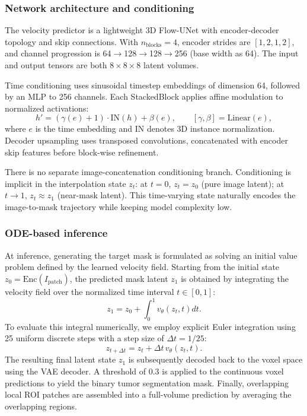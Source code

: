 \documentclass{iopjournal}
\begin{document}
\subsubsection{Network architecture and conditioning}
The velocity predictor is a lightweight 3D Flow-UNet with encoder-decoder topology and skip connections. With $n_{\mathrm{blocks}}=4$, encoder strides are $[1,2,1,2]$, and channel progression is 64$\rightarrow$128$\rightarrow$128$\rightarrow$256 (base width as 64). The input and output tensors are both 8\,$\times$\,8\,$\times$\,8 latent volumes.

Time conditioning uses sinusoidal timestep embeddings of dimension 64, followed by an MLP to 256 channels. Each StackedBlock applies affine modulation to normalized activations:
\begin{equation}
h' = (\gamma(e)+1)\cdot \mathrm{IN}(h) + \beta(e), \qquad [\gamma,\beta]=\mathrm{Linear}(e),
\end{equation}
where $e$ is the time embedding and $\mathrm{IN}$ denotes 3D instance normalization. Decoder upsampling uses transposed convolutions, concatenated with encoder skip features before block-wise refinement.

There is no separate image-concatenation conditioning branch. Conditioning is implicit in the interpolation state $z_t$: at $t=0$, $z_t=z_0$ (pure image latent); at $t\to 1$, $z_t\approx z_1$ (near-mask latent). This time-varying state naturally encodes the image-to-mask trajectory while keeping model complexity low.

\subsubsection{ODE-based inference}
At inference, generating the target mask is formulated as solving an initial value problem defined by the learned velocity field. Starting from the initial state $z_0 = \mathrm{Enc}(I_{\mathrm{patch}})$, the predicted mask latent $z_1$ is obtained by integrating the velocity field over the normalized time interval $t \in [0, 1]$:
\begin{equation}
z_1 = z_0 + \int_{0}^{1} v_\theta(z_t, t)dt.
\end{equation}
To evaluate this integral numerically, we employ explicit Euler integration using 25 uniform discrete steps with a step size of $\Delta t=1/25$:
\begin{equation}
z_{t+\Delta t}=z_t+\Delta t\, v_\theta(z_t,t).
\end{equation}
The resulting final latent state $z_1$ is subsequently decoded back to the voxel space using the VAE decoder. A threshold of 0.3 is applied to the continuous voxel predictions to yield the binary tumor segmentation mask. Finally, overlapping local ROI patches are assembled into a full-volume prediction by averaging the overlapping regions.
\end{document}
